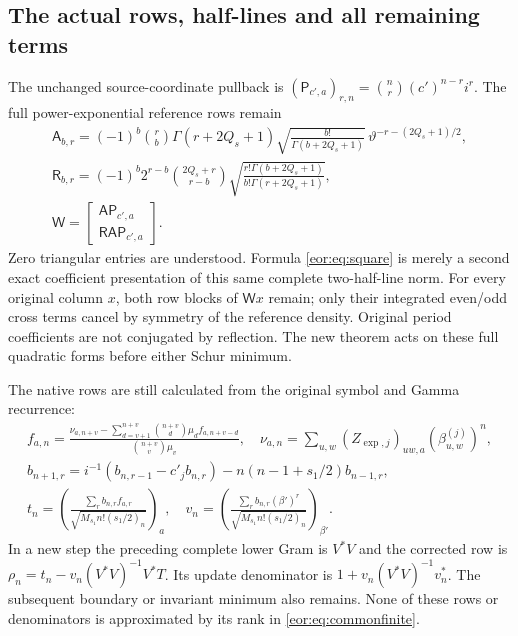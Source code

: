 \documentclass[11pt,a4paper]{article}
\begin{document}
\subsection{The actual rows, half-lines and all remaining terms}
The unchanged source-coordinate pullback is
$(\mathsf P_{c',a})_{r,n}=\binom nr(c')^{n-r}i^r$.
The full power-exponential reference rows remain
\begin{equation}
\begin{gathered}
 \mathsf A_{b,r}=(-1)^b\binom rb\Gamma(r+2Q_s+1)
 \sqrt{\frac{b!}{\Gamma(b+2Q_s+1)}}\,
 \vartheta^{-r-(2Q_s+1)/2},\\
 \mathsf R_{b,r}=(-1)^b2^{r-b}\binom{2Q_s+r}{r-b}
 \sqrt{\frac{r!\Gamma(b+2Q_s+1)}{b!\Gamma(r+2Q_s+1)}},\\
 \mathsf W=\begin{bmatrix}\mathsf A\mathsf P_{c',a}\\
                           \mathsf R\mathsf A\mathsf P_{c',a}\end{bmatrix}.
\end{gathered}\label{eor:eq:W}
\end{equation}
Zero triangular entries are understood. Formula \eqref{eor:eq:square} is merely a
second exact coefficient presentation of this same complete two-half-line norm.
For every original column $x$, both row blocks of $\mathsf Wx$ remain; only their
integrated even/odd cross terms cancel by symmetry of the reference density.
Original period coefficients are not conjugated by reflection.
The new theorem acts on these full quadratic forms before either Schur minimum.

The native rows are still calculated from the original symbol and Gamma recurrence:
\begin{equation}
\begin{gathered}
 f_{a,n}=\frac{\nu_{a,n+v}-\sum_{d=v+1}^{n+v}\binom{n+v}{d}
               \mu_df_{a,n+v-d}}{\binom{n+v}{v}\mu_v},\quad
 \nu_{a,n}=\sum_{u,w}(Z_{\exp,j})_{uw,a}(\beta_{u,w}^{(j)})^n,\\
 b_{n+1,r}=i^{-1}(b_{n,r-1}-c'_jb_{n,r})
                 -n(n-1+s_1/2)b_{n-1,r},\\
 t_n=\left(\frac{\sum_r b_{n,r}f_{a,r}}{\sqrt{M_{s_1}n!(s_1/2)_n}}\right)_a,
 \quad
 v_n=\left(\frac{\sum_r b_{n,r}(\beta')^r}{\sqrt{M_{s_1}n!(s_1/2)_n}}\right)_{\beta'}.
\end{gathered}\label{eor:eq:rows}
\end{equation}
In a new step the preceding complete lower Gram is $V^*V$ and the corrected row
is $\rho_n=t_n-v_n(V^*V)^{-1}V^*T$.
Its update denominator is $1+v_n(V^*V)^{-1}v_n^*$.
The subsequent boundary or invariant minimum also remains. None of these rows
or denominators is approximated by its rank in \eqref{eor:eq:commonfinite}.
\end{document}
